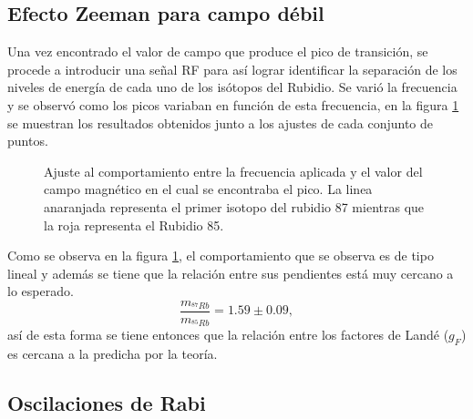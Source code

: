 \documentclass[%
 reprint,
 amsmath,amssymb,
 aps,
]{revtex4-1}
\begin{document}
\subsection{Efecto Zeeman para campo débil}
Una vez encontrado el valor de campo que produce el pico de transición, se procede a introducir una señal RF para así lograr identificar la separación de los niveles de energía de cada uno de los isótopos del Rubidio. Se varió la frecuencia y se observó como los picos variaban en función de esta frecuencia, en la figura \ref{feq_corr} se muestran los resultados obtenidos junto a los ajustes de cada conjunto de puntos.
\begin{figure}[h]
\caption{\label{feq_corr} Ajuste al comportamiento entre la frecuencia aplicada y el valor del campo magnético en el cual se encontraba el pico. La linea anaranjada representa el primer isotopo del rubidio 87 mientras que la roja representa el Rubidio 85.}
\end{figure}
Como se observa en la figura \ref{feq_corr}, el comportamiento que se observa es de tipo lineal y además se tiene que la relación entre sus pendientes está muy cercano a lo esperado.
\begin{equation}
    \frac{m_{^{87}Rb}}{m_{^{85}Rb}}= 1.59\pm 0.09,
    \label{relacion_pendientes}
\end{equation}
así de esta forma se tiene entonces que la relación entre los factores de Landé ($g_F$) es cercana a la predicha por la teoría.
\subsection{Oscilaciones de Rabi}
\end{document}
